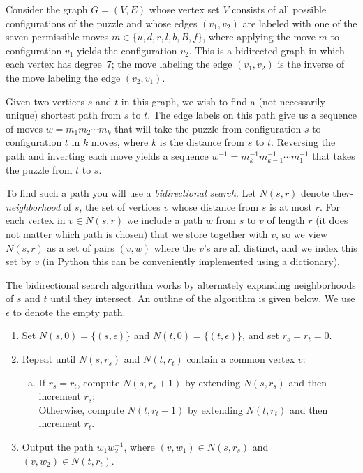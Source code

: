 \documentclass[11pt]{article}
\theoremstyle{definition}
\begin{document}
Consider the graph $G=(V,E)$ whose vertex set $V$ consists of all possible configurations of the puzzle and whose edges $(v_1,v_2)$ are labeled with one of the seven permissible moves $m\in \{u,d,r,l,b,B,f\}$, where applying the move $m$ to configuration $v_1$ yields the configuration $v_2$.
This is a bidirected graph in which each vertex has degree~7; the move labeling the edge $(v_1,v_2)$ is the inverse of the move labeling the edge $(v_2,v_1)$.

Given two vertices $s$ and $t$ in this graph, we wish to find a (not necessarily unique) shortest path from $s$ to $t$.
The edge labels on this path give us a sequence of moves $w=m_1m_2\cdots m_k$ that will take the puzzle from configuration $s$ to configuration $t$ in $k$ moves, where $k$ is the distance from $s$ to $t$.
Reversing the path and inverting each move yields a sequence $w^{-1}=m_k^{-1}m_{k-1}^{-1}\cdots m_1^{-1}$ that takes the puzzle from $t$ to $s$.

To find such a path you will use a \emph{bidirectional search}.
Let $N(s,r)$ denote the$r$-\emph{neighborhood} of $s$, the set of vertices $v$ whose distance from $s$ is at most $r$.
For each vertex in $v\in N(s,r)$ we include a path $w$ from $s$ to $v$ of length $r$ (it does not matter which path is chosen) that we store together with $v$, so we view $N(s,r)$ as a set of pairs $(v,w)$ where the $v$'s are all distinct, and we index this set by $v$ (in Python this can be conveniently implemented using a dictionary).

The bidirectional search algorithm works by alternately expanding neighborhoods of $s$ and $t$ until they intersect.
An outline of the algorithm is given below.  We use $\epsilon$ to denote the empty path.

\begin{enumerate}
\item Set $N(s,0) = \{ (s,\epsilon) \}$ and $N(t,0) = \{(t,\epsilon)\}$, and set $r_s=r_t=0$.
\item Repeat until $N(s,r_s)$ and $N(t,r_t)$ contain a common vertex $v$:
\begin{enumerate}[a.]
\item If $r_s = r_t$, compute $N(s,r_s+1)$ by extending $N(s,r_s)$ and then increment $r_s$;\\
Otherwise, compute $N(t,r_t+1)$ by extending $N(t,r_t)$ and then increment $r_t$.
\end{enumerate}
\item  Output the path $w_1w_2^{-1}$, where $(v,w_1)\in N(s,r_s)$ and $(v,w_2)\in N(t,r_t)$.
\end{enumerate}
\end{document}
